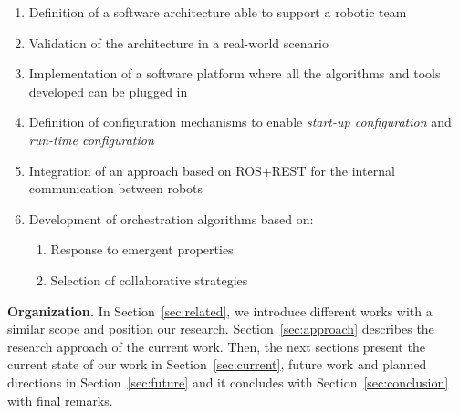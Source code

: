 \begin{enumerate}
\item Definition of a software architecture able to support a robotic team
\item Validation of the architecture in a real-world scenario
\item Implementation of a software platform where all the algorithms and tools developed can be plugged in 
\item Definition of configuration mechanisms to enable \emph{start-up configuration} and \emph{run-time configuration}
\item Integration of an approach based on ROS+REST for the internal communication between robots
\item Development of orchestration algorithms based on:
\begin{enumerate}
\item Response to emergent properties
\item Selection of collaborative strategies
\end{enumerate}
\end{enumerate}

\textbf{Organization.} 
In Section~\ref{sec:related}, we introduce different works with a similar scope and position our research.
Section~\ref{sec:approach} describes the research approach of the current work.
Then, the next sections present the current state of our work in Section~\ref{sec:current}, future work and planned directions in Section~\ref{sec:future} and it concludes with Section~\ref{sec:conclusion} with final remarks.